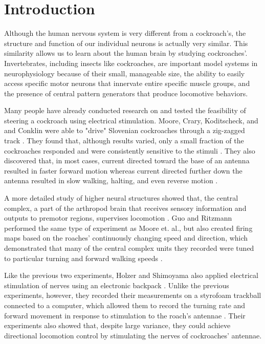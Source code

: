 \section{Introduction}


Although the human nervous system is very different from a cockroach’s, the structure and function of our individual neurons is actually very similar. This similarity allows us to learn about the human brain by studying cockroaches'. Invertebrates, including insects like cockroaches, are important model systems in neurophysiology because of their small, manageable size, the ability to easily access specific motor neurons that innervate entire specific muscle groups, and the presence of central pattern generators that produce locomotive behaviors. 


\bigskip

Many people have already conducted research on and tested the feasibility of steering a cockroach using electrical stimulation. Moore, Crary, Koditscheck, and and Conklin were able to "drive" Slovenian cockroaches through a zig-zagged track \citep{moore1998directed}. They found that, although results varied, only a small fraction of the cockroaches responded and were consistently sensitive to the stimuli \citep{moore1998directed}. They also discovered that, in most cases, current directed toward the base of an antenna resulted in faster forward motion whereas current directed further down the antenna resulted in slow walking, halting, and even reverse motion \citep{moore1998directed}.

\bigskip

A more detailed study of higher neural structures showed that, the central complex, a part of the arthropod brain that receives sensory information and outputs to premotor regions, supervises locomotion \citep{guo2013neural}. Guo and Ritzmann performed the same type of experiment as Moore et. al., but also created firing maps based on the roaches' continuously changing speed and direction, which demonstrated that many of the central complex units they recorded were tuned to particular turning and forward walking speeds \citep{guo2013neural}.

\bigskip

Like the previous two experiments, Holzer and Shimoyama also applied electrical stimulation of nerves using an electronic backpack \citep{holzer1997locomotion}. Unlike the previous experiments, however, they recorded their measurements on a styrofoam trackball connected to a computer, which allowed them to record the turning rate and forward movement in response to stimulation to the roach's antennae \citep{holzer1997locomotion}. Their experiments also showed that, despite large variance, they could achieve directional locomotion control by stimulating the nerves of cockroaches' antennae.

